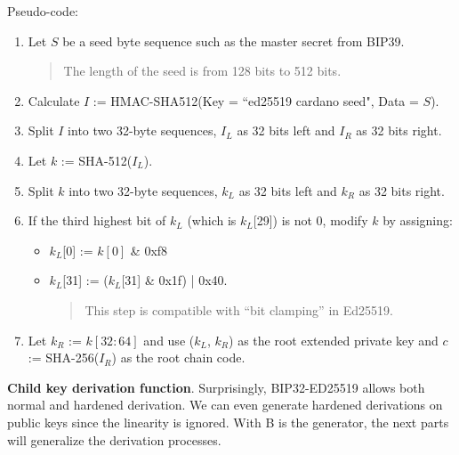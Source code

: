 Pseudo-code:
\begin{enumerate}
    \item Let $S$ be a seed byte sequence such as the master secret from BIP39.
          \begin{quote}
              The length of the seed is from 128 bits to 512 bits.
          \end{quote}
          \bigskip

    \item Calculate $I$ := HMAC-SHA512(Key = ``ed25519 cardano seed", Data = $S$).
          \bigskip
    \item Split $I$ into two 32-byte sequences, $I_L$ as 32 bits left and $I_R$ as 32 bits right.
          \bigskip

    \item Let $k$ := SHA-512($I_L$).
          \bigskip
    \item Split $k$ into two 32-byte sequences, $k_L$ as 32 bits left and $k_R$ as 32 bits right.
          \bigskip
    \item If the third highest bit of $k_L$ (which is $k_L$[29]) is not 0, modify $k$ by assigning:
          \begin{itemize}
              \item $k_L$[0] := $k[0]$ \& 0xf8
              \item $k_L$[31] := ($k_L$[31] \& 0x1f) | 0x40.
                    \begin{quote}
                        This step is compatible with “bit clamping” in Ed25519.
                    \end{quote}
          \end{itemize}
          \bigskip
    \item Let $k_R$ := $k[32:64]$ and use ($k_L$, $k_R$) as the root extended private key and $c$ := SHA-256($I_R$) as the root chain code.
\end{enumerate}

\bigskip
{\textbf{Child key derivation function}}. Surprisingly, BIP32-ED25519 allows both normal and hardened derivation. We can even generate hardened derivations on public keys since the linearity is ignored. With B is the generator, the next parts will generalize the derivation processes.

